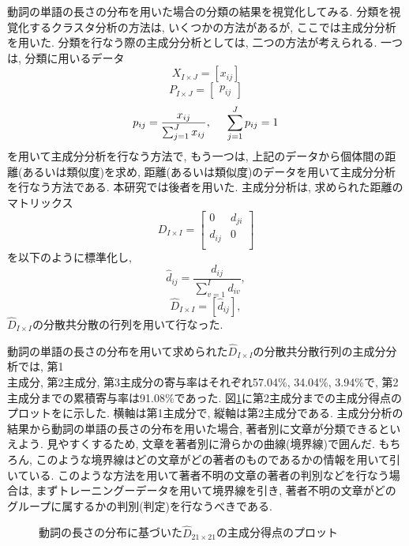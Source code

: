 動詞の単語の長さの分布を用いた場合の分類の結果を視覚化してみる. 分類を視覚化するクラスタ分析の方法は, いくつかの方法があるが, ここでは主成分分析を用いた. 分類を行なう際の主成分分析としては, 二つの方法が考えられる. 一つは, 分類に用いるデータ
\[X_{I \times J}=\left [ x_{ij} \right ] \]
\[ P_{I\times J}=\left[ \begin{array}{c} p_{ij} \end{array} \right] \]
\[p_{ij}=\frac{x_{ij}}{\sum_{j=1}^J{x_{ij}}},\hspace{0.5cm}
\sum_{j=1}^J{p_{ij}}=1\]
を用いて主成分分析を行なう方法で, もう一つは, 上記のデータから個体間の距離(あるいは類似度)を求め, 距離(あるいは類似度)のデータを用いて主成分分析を行なう方法である. 本研究では後者を用いた. 
主成分分析は, 求められた距離のマトリックス
\[ D_{I\times I}=\left[ \begin{array}{cc}
0  & d_{ji} \\
d_{ij}& 0 \\
\end{array} \right] \]
を以下のように標準化し, 
\[ \widehat{d}_{ij}=\frac{d_{ij}}{\sum_{v=1}^I d_{iv}},\]
 \vspace*{-0.2mm}
\[ \widehat{D}_{I \times I}=\left[ \widehat{d}_{ij} \right], \]
$\widehat{D}_{I \times I}$の分散共分散の行列を用いて行なった. 

動詞の単語の長さの分布を用いて求められた$\widehat{D}_{I \times I}$の分散共分散行列の主成分分析では, 第1\\主成分, 第2主成分, 第3主成分の寄与率はそれぞれ57.04\%, 34.04\%, 3.94\%で, 第2主成分までの累積寄与率は91.08\%であった. 図\ref{dlcp}に第2主成分までの主成分得点のプロットをに示した. 横軸は第1主成分で, 縦軸は第2主成分である. 主成分分析の結果から動詞の単語の長さの分布を用いた場合, 著者別に文章が分類できるといえよう. 見やすくするため, 文章を著者別に滑らかの曲線(境界線)で囲んだ. もちろん, このような境界線はどの文章がどの著者のものであるかの情報を用いて引いている. このような方法を用いて著者不明の文章の著者の判別などを行なう場合は, まずトレーニングーデータを用いて境界線を引き, 著者不明の文章がどのグループに属するかの判別(判定)を行なうべきである.
{\unitlength=1mm
\begin{figure}
\begin{center}
    
    
    
\end{center}
\caption{動詞の長さの分布に基づいた$\widehat{D}_{21 \times 21}$の主成分得点のプロット}\label{dlcp}
\end{figure}
}


